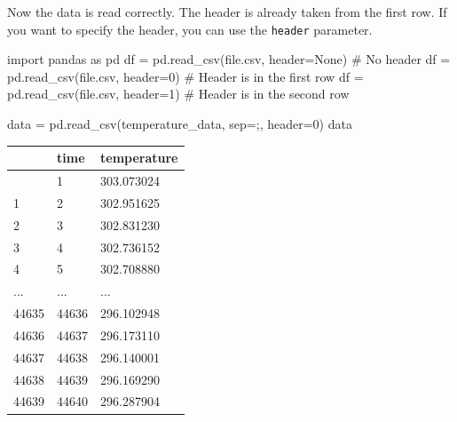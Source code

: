 \documentclass[
  letterpaper,
  DIV=11,
  numbers=noendperiod]{scrreprt}
\newenvironment{Shaded}{\begin{snugshade}}{\end{snugshade}}
\newcommand{\CommentTok}[1]{\textcolor[rgb]{0.37,0.37,0.37}{#1}}
\newcommand{\DecValTok}[1]{\textcolor[rgb]{0.68,0.00,0.00}{#1}}
\newcommand{\ImportTok}[1]{\textcolor[rgb]{0.00,0.46,0.62}{#1}}
\newcommand{\NormalTok}[1]{\textcolor[rgb]{0.00,0.23,0.31}{#1}}
\newcommand{\OperatorTok}[1]{\textcolor[rgb]{0.37,0.37,0.37}{#1}}
\newcommand{\StringTok}[1]{\textcolor[rgb]{0.13,0.47,0.30}{#1}}
\newcommand{\VariableTok}[1]{\textcolor[rgb]{0.07,0.07,0.07}{#1}}
\begin{document}
Now the data is read correctly. The header is already taken from the
first row. If you want to specify the header, you can use the
\texttt{header} parameter.

\begin{Shaded}
\begin{Highlighting}[]
\ImportTok{import}\NormalTok{ pandas }\ImportTok{as}\NormalTok{ pd}
\NormalTok{df }\OperatorTok{=}\NormalTok{ pd.read\_csv(}\StringTok{\textquotesingle{}file.csv\textquotesingle{}}\NormalTok{, header}\OperatorTok{=}\VariableTok{None}\NormalTok{) }\CommentTok{\# No header}
\NormalTok{df }\OperatorTok{=}\NormalTok{ pd.read\_csv(}\StringTok{\textquotesingle{}file.csv\textquotesingle{}}\NormalTok{, header}\OperatorTok{=}\DecValTok{0}\NormalTok{) }\CommentTok{\# Header is in the first row}
\NormalTok{df }\OperatorTok{=}\NormalTok{ pd.read\_csv(}\StringTok{\textquotesingle{}file.csv\textquotesingle{}}\NormalTok{, header}\OperatorTok{=}\DecValTok{1}\NormalTok{) }\CommentTok{\# Header is in the second row}
\end{Highlighting}
\end{Shaded}

\begin{Shaded}
\begin{Highlighting}[]
\NormalTok{data }\OperatorTok{=}\NormalTok{ pd.read\_csv(temperature\_data, sep}\OperatorTok{=}\StringTok{\textquotesingle{};\textquotesingle{}}\NormalTok{, header}\OperatorTok{=}\DecValTok{0}\NormalTok{)}
\NormalTok{data}
\end{Highlighting}
\end{Shaded}

\begin{longtable}[]{@{}lll@{}}
\toprule\noalign{}
& time & temperature \\
\midrule\noalign{}
\endhead
\bottomrule\noalign{}
\endlastfoot
0 & 1 & 303.073024 \\
1 & 2 & 302.951625 \\
2 & 3 & 302.831230 \\
3 & 4 & 302.736152 \\
4 & 5 & 302.708880 \\
... & ... & ... \\
44635 & 44636 & 296.102948 \\
44636 & 44637 & 296.173110 \\
44637 & 44638 & 296.140001 \\
44638 & 44639 & 296.169290 \\
44639 & 44640 & 296.287904 \\
\end{longtable}
\end{document}
